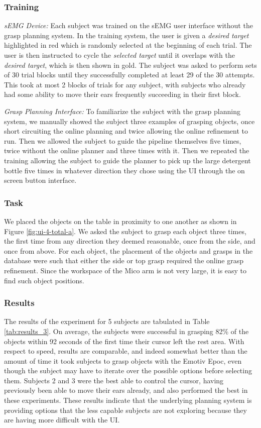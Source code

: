 \subsubsection{Training}
\emph{sEMG Device:} Each subject was trained on the sEMG user interface without the grasp planning system. In the training system, the user is given a \emph{desired target} highlighted in red which is randomly selected at the beginning of each trial. The user is then instructed to cycle the \emph{selected target} until it overlaps with the \emph{desired target}, which is then shown in gold. The subject was asked to perform sets of 30 trial blocks until they successfully completed at least 29 of the 30 attempts. This took at most 2 blocks of trials for any subject, with subjects who already had some ability to move their ears frequently succeeding in their first block. 

\emph{Grasp Planning Interface:} To familiarize the subject with the grasp planning system, we manually showed the subject three examples of grasping objects, once short circuiting the online planning and twice allowing the online refinement to run. Then we allowed the subject to guide the pipeline themselves five times, twice without the online planner and three times with it. Then we repeated the training allowing the subject to guide the planner to pick up the large detergent bottle five times in whatever direction they chose using the UI through the on screen button interface. 

\subsubsection{Task}
We placed the objects on the table in proximity to one another as shown in Figure \ref{fig:ui-4-total-a}. We asked the subject to grasp each object three times, the first time from any direction they deemed reasonable, once from the side, and once from above. For each object, the placement of the objects and grasps in the database were such that either the side or top grasp required the online grasp refinement. Since the workspace of the Mico arm is not very large, it is easy to find such object positions. 

\subsubsection{Results}
\label{sec:semg_results}
The results of the experiment for 5 subjects are tabulated in Table \ref{tab:results_3}. On average, the subjects were successful in grasping 82\% of the objects within 92 seconds of the first time their cursor left the rest area. With respect to speed,  results are comparable, and indeed somewhat better than the amount of time it took subjects to grasp objects with the Emotiv Epoc, even though the subject may have to iterate over the possible options before selecting them. Subjects 2 and 3 were the best able to control the cursor, having previously been able to move their ears already, and also performed the best in these experiments. These results indicate that the underlying planning system is providing options that the less capable subjects are not exploring because they are having more difficult with the UI. 

